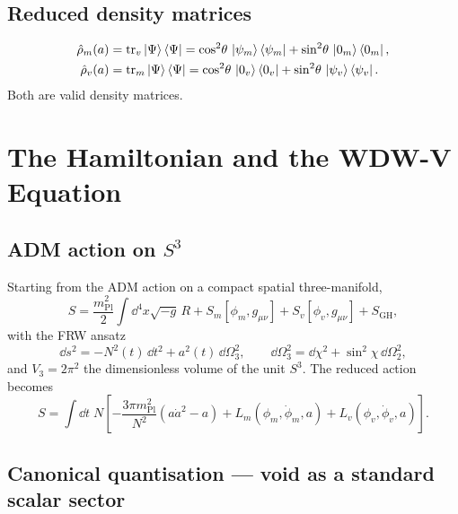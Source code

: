 \documentclass[12pt,a4paper]{article}
\theoremstyle{plain}
\theoremstyle{definition}
\newcommand{\Mpl}{m_{\mathrm{Pl}}}
\begin{document}
\subsection{Reduced density matrices}

\begin{align}
  \hat\rho_m(a) &= \mathrm{tr}_v\ket{\Psi}\bra{\Psi}
  = \cos^2\!\theta\,\ket{\psi_m}\bra{\psi_m}
  + \sin^2\!\theta\,\ket{0_m}\bra{0_m},
  \label{eq:rho_m}\\
  \hat\rho_v(a) &= \mathrm{tr}_m\ket{\Psi}\bra{\Psi}
  = \cos^2\!\theta\,\ket{0_v}\bra{0_v}
  + \sin^2\!\theta\,\ket{\psi_v}\bra{\psi_v}.
  \label{eq:rho_v}
\end{align}
Both are valid density matrices.

\section{The Hamiltonian and the WDW-V Equation}
\label{sec:hamiltonian}

\subsection{ADM action on $S^3$}

Starting from the ADM action on a compact spatial three-manifold,
\begin{equation}
  S = \frac{\Mpl^2}{2}\int\dd^4x\sqrt{-g}\,R
    + S_m[\phi_m,g_{\mu\nu}] + S_v[\phi_v,g_{\mu\nu}] + S_{\mathrm{GH}},
  \label{eq:ADM_action}
\end{equation}
with the FRW ansatz
\begin{equation}
  \dd s^2 = -N^2(t)\,\dd t^2 + a^2(t)\,\dd\Omega_3^2,
  \qquad
  \dd\Omega_3^2 = \dd\chi^2 + \sin^2\!\chi\,\dd\Omega_2^2,
  \label{eq:FRW}
\end{equation}
and $V_3 = 2\pi^2$ the dimensionless volume of the unit $S^3$.
The reduced action becomes
\begin{equation}
  S = \int\dd t\;N\left[
    -\frac{3\pi\Mpl^2}{N^2}(a\dot a^2 - a)
    + L_m(\phi_m,\dot\phi_m,a) + L_v(\phi_v,\dot\phi_v,a)
  \right].
  \label{eq:reduced_action}
\end{equation}

\subsection{Canonical quantisation --- void as a standard scalar sector}
\end{document}
